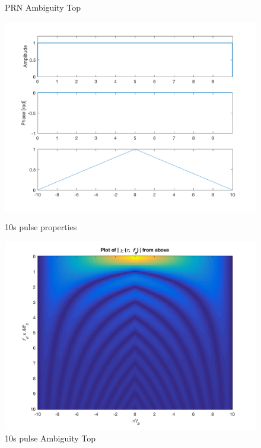 \begin{figure}[!htbp]
\begin{minipage}[b]{0.45\textwidth}
    \caption{PRN Ambiguity Top}
  \end{minipage}
  \vfill
    \begin{minipage}[b]{0.45\textwidth}
    \includegraphics[width=\textwidth]{images/long_props}
    \caption{10s pulse properties}
  \end{minipage}
 \hfill
  \begin{minipage}[b]{0.45\textwidth}
    \includegraphics[width=\textwidth]{images/long_top}
    \caption{10s pulse Ambiguity Top}
    \label{fig:pulse10s_top}
  \end{minipage}
\end{figure}



